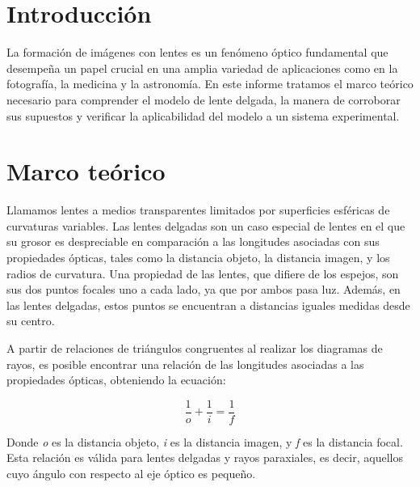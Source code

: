 \documentclass[a4paper,12pt]{article}
\begin{document}
\begin{multicols*}{2}

\section*{Introducción}

    La formación de imágenes con lentes es un fenómeno óptico fundamental que desempeña un papel crucial en una amplia variedad de aplicaciones como en la fotografía, la medicina y la astronomía. 
    En este informe tratamos el marco teórico necesario para comprender el modelo de lente delgada, la manera de corroborar sus supuestos y verificar la aplicabilidad del modelo a un sistema experimental.

\section*{Marco teórico}

    Llamamos lentes a medios transparentes limitados por superficies esféricas de curvaturas variables. Las lentes delgadas son un caso especial de lentes en el que su grosor es despreciable en comparación a las longitudes asociadas con sus propiedades ópticas, tales como la distancia objeto, la distancia imagen, y los radios de curvatura. Una propiedad de las lentes, que difiere de los espejos, son sus dos puntos focales uno a cada lado, ya que por ambos pasa luz. Además, en las lentes delgadas, estos puntos se encuentran a distancias iguales medidas desde su centro.

    A partir de relaciones de triángulos congruentes al realizar los diagramas de rayos, es posible encontrar una relación de las longitudes asociadas a las propiedades ópticas, obteniendo la ecuación:
    
    \begin{equation} 
        \label{eq:1/i+1/o}
        \frac{1}{o}+\frac{1}{i}=\frac{1}{f}
    \end{equation}

    Donde \textit{o} es la distancia objeto, \textit{i} es la distancia imagen, y \textit{f} es la distancia focal. Esta relación es válida para lentes delgadas y rayos paraxiales, es decir, aquellos cuyo ángulo con respecto al eje óptico es pequeño. %


\end{multicols*}
\end{document}
